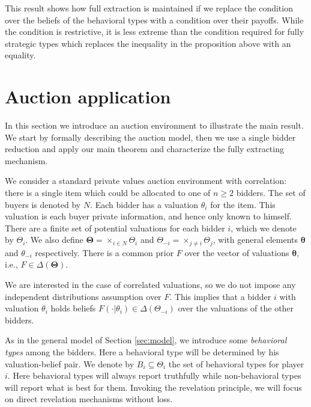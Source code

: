 \documentclass[12pt]{article}
\begin{document}
This result shows how full extraction is maintained if we replace the condition over the beliefs of the behavioral types with a condition over their payoffs. While the condition is restrictive, it is less extreme than the condition required for fully strategic types which replaces the inequality in the proposition above with an equality.


\section{Auction application}\label{sec:auction}

In this section we introduce an auction environment to illustrate the main result. We start by formally describing the auction model, then we use a single bidder reduction and apply our main theorem and characterize the fully extracting mechanism.

We consider a standard private values auction environment with correlation: there is a single item which could be allocated to one of $n\geq 2$ bidders. The set of buyers is denoted by $N$. Each bidder has a valuation $\theta_i$ for the item. This valuation is each buyer private information, and hence only known to himself. There are a finite set of potential valuations for each bidder $i$, which we denote by $\Theta_i$. We also define $\bm\Theta=\times_{i\in N} \Theta_i$ and $\Theta_{-i}=\times_{j\neq i} \Theta_j$, with general elements $\bm\theta$ and $\theta_{-i}$ respectively. There is a common prior $F$ over the vector of valuations $\bm\theta$, i.e., $F\in\Delta(\bm\Theta)$. 

We are interested in the case of correlated valuations, so we do not impose any independent distributions assumption over $F$. This implies that a bidder $i$ with valuation $\theta_i$ holds beliefs $F(\cdot|\theta_i)\in \Delta(\Theta_{-i})$ over the valuations of the other bidders. %

As in the general model of Section \ref{sec:model}, we introduce some \emph{behavioral types} among the bidders. Here a behavioral type will be determined by his valuation-belief pair. We denote by $B_i\subseteq \Theta_i$ the set of behavioral types for player $i$. Here behavioral types will always report truthfully while non-behavioral types will report what is best for them. Invoking the revelation principle, we will focus on direct revelation mechanisms without loss.
\end{document}
